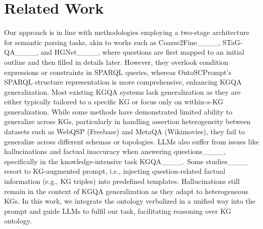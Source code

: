\section{Related Work}
Our approach is in line with methodologies employing a two-stage architecture for semantic parsing tasks, akin to works such as Coarse2Fine____, STaG-QA____, and HGNet____, where questions are first mapped to an initial outline and then filled in details later. However, they overlook condition expressions or constraints in SPARQL queries, whereas OntoSCPrompt's SPARQL structure representation is more comprehensive, enhancing KGQA generalization.
Most existing KGQA systems lack generalization as they are either typically tailored to a specific KG or focus only on within-a-KG generalization. While some methods have demonstrated limited ability to generalize across KGs, particularly in handling assertion heterogeneity between datasets such as WebQSP (Freebase) and MetaQA (Wikimovies), they fail to generalize across different schemas or topologies. LLMs also suffer from issues like hallucinations and factual inaccuracy when answering questions____, specifically in the knowledge-intensive task KGQA____. Some studies____ resort to KG-augmented prompt, i.e., injecting question-related factual information (e.g., KG triples) into predefined templates. Hallucinations still remain in the context of KGQA generalization as they adapt to heterogeneous KGs. In this work, we integrate the ontology verbalized in a unified way into the prompt and guide LLMs to fulfil our task, facilitating reasoning over KG ontology.
